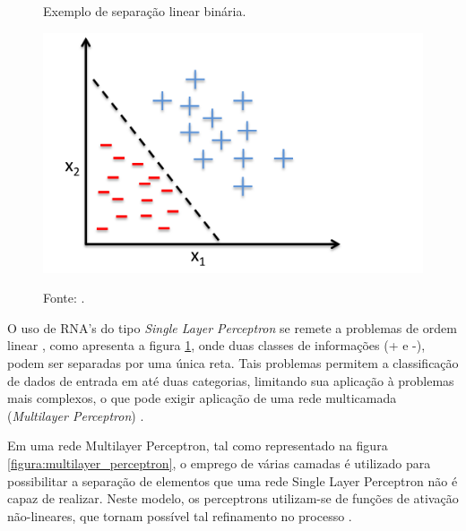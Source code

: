 \begin{figure}[H]
	\caption{Exemplo de separação linear binária.}
	\centering %
	\includegraphics[width=14cm]{resources/perceptron_binary.png} %
	\label{figura:perceptron_binary}
	\caption*{Fonte: .}
\end{figure}

O uso de RNA's do tipo \textit{Single Layer Perceptron} se remete a problemas de ordem linear \cite{haykin2009neural}, como apresenta a figura \ref{figura:perceptron_binary}, onde duas classes de informações (+ e -), podem ser separadas por uma única reta. Tais problemas permitem a classificação de dados de entrada em até duas categorias, limitando sua aplicação à problemas mais complexos, o que pode exigir aplicação de uma rede multicamada (\textit{Multilayer Perceptron}) \cite{fausett1994fundamentals}.

Em uma rede Multilayer Perceptron, tal como representado na figura \ref{figura:multilayer_perceptron}, o emprego de várias camadas é utilizado para possibilitar a separação de elementos que uma rede Single Layer Perceptron não é capaz de realizar. Neste modelo, os perceptrons utilizam-se de funções de ativação não-lineares, que tornam possível tal refinamento no processo \cite{marius2009}.

